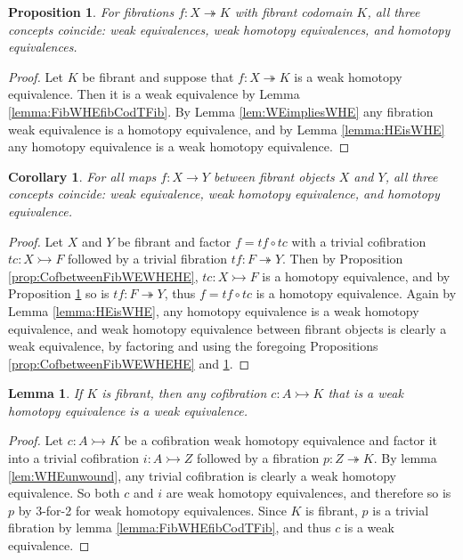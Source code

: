\documentclass[11pt,reqno]{amsart}
\newcommand{\mono}{\ensuremath{\rightarrowtail}}
\newcommand{\cof}{\ensuremath{\rightarrowtail}}
\newcommand{\fib}{\ensuremath{\twoheadrightarrow}}
\renewcommand{\to}{\ensuremath{\rightarrow}}
\newcommand{\onto}{\ensuremath{\twoheadrightarrow}}
\newtheorem{proposition}[theorem]{Proposition}
\newtheorem{lemma}[theorem]{Lemma}
\newtheorem{corollary}[theorem]{Corollary}
\theoremstyle{remark}
\theoremstyle{definition}
\begin{document}
\begin{proposition}\label{prop:fibobjWEHEWHE} For fibrations $f : X \fib K$ with fibrant codomain $K$, all three concepts coincide: weak equivalences, weak homotopy equivalences, and homotopy equivalences.
\end{proposition}

\begin{proof}
Let $K$ be fibrant and suppose that $f:X\fib K$ is a weak homotopy equivalence.   Then it is a weak equivalence by Lemma \ref{lemma:FibWHEfibCodTFib}.  By Lemma \ref{lem:WEimpliesWHE} any fibration weak equivalence is a homotopy equivalence, and by 
Lemma \ref{lemma:HEisWHE} any homotopy equivalence is a weak homotopy equivalence.
\end{proof}

\begin{corollary} 
For all maps $f : X \to Y$ between fibrant objects $X$ and $Y$, all three concepts coincide: weak equivalence, weak homotopy equivalence, and homotopy equivalence.
\end{corollary}

\begin{proof}
Let $X$ and $Y$ be fibrant and factor $f = tf\circ tc$ with a trivial cofibration $tc : X \cof F$ followed by a trivial fibration $tf : F \fib Y$.
 Then by Proposition \ref{prop:CofbetweenFibWEWHEHE}, $tc : X \cof F$ is a homotopy equivalence, and by Proposition \ref{prop:fibobjWEHEWHE} so is $tf : F \fib Y$, thus $f = tf\circ tc$  is a homotopy equivalence. Again by Lemma \ref{lemma:HEisWHE}, any homotopy equivalence is a weak homotopy equivalence, and weak homotopy equivalence between fibrant objects is clearly a weak equivalence, by factoring and using the foregoing Propositions \ref{prop:CofbetweenFibWEWHEHE} and \ref{prop:fibobjWEHEWHE}.
\end{proof}

\begin{lemma}\label{CofWHEfibCodTCof}
If $K$ is fibrant, then any cofibration $c : A \mono K$ that is a weak homotopy equivalence is a weak equivalence.
\end{lemma}
\begin{proof}
Let $c : A \mono K$ be a cofibration weak homotopy equivalence and factor it into a trivial cofibration $i : A\mono Z$ followed by a fibration $p: Z\onto K$.  By lemma \ref{lem:WHEunwound}, any trivial cofibration is clearly a weak homotopy equivalence.  So both 
$c$ and $i$ are weak homotopy equivalences, and therefore so is $p$ by 3-for-2 for weak homotopy equivalences.   Since $K$ is fibrant, $p$ is a trivial fibration by lemma \ref{lemma:FibWHEfibCodTFib}, and thus $c$ is a weak equivalence.  
\end{proof}
\end{document}
